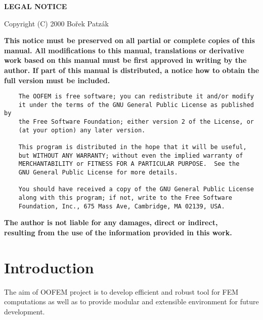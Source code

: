 \documentclass[12pt,draft]{article}
\begin{document}
\latex{\clearpage}
\html{\newline\newline\htmlrule\newline}
\begin{center}
{\large \bf LEGAL NOTICE}
\end{center}\vspace*{1cm}
\centerline{Copyright (C) 2000 Bo\v{r}ek Patz\'{a}k}\vspace{1cm}
\begin{center}
{\bf This notice must be preserved on all partial or complete copies
of this manual. All modifications to this manual, translations or
derivative work based on this manual must be first approved in writing
by the author. If part of this manual is distributed, a notice how to
obtain the full version must be included.}\\

\begin{verbatim}
    The OOFEM is free software; you can redistribute it and/or modify
    it under the terms of the GNU General Public License as published by
    the Free Software Foundation; either version 2 of the License, or
    (at your option) any later version.

    This program is distributed in the hope that it will be useful,
    but WITHOUT ANY WARRANTY; without even the implied warranty of
    MERCHANTABILITY or FITNESS FOR A PARTICULAR PURPOSE.  See the
    GNU General Public License for more details.

    You should have received a copy of the GNU General Public License
    along with this program; if not, write to the Free Software
    Foundation, Inc., 675 Mass Ave, Cambridge, MA 02139, USA.                                                               
\end{verbatim}

{\bf The author is not liable for any damages, direct or indirect,\\
resulting from the use of the information provided in this work.}
\end{center}
\clearpage
\tableofcontents
\clearpage

\section{Introduction}

The aim of OOFEM project is to develop efficient and robust tool for
FEM computations as well as to provide modular and extensible
environment for future development.
\end{document}
